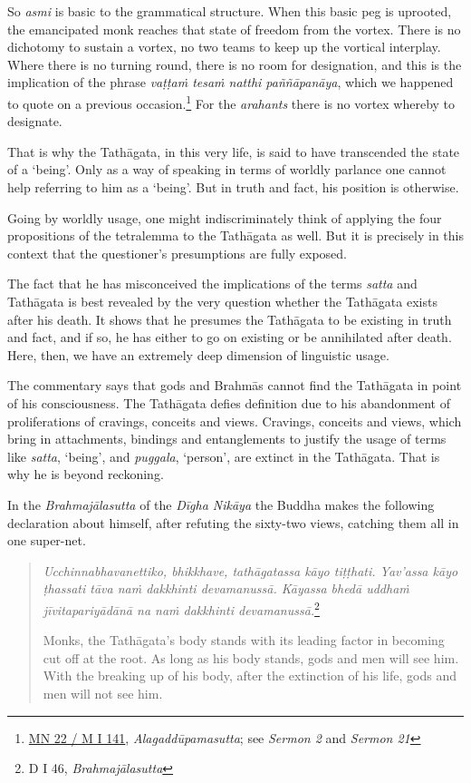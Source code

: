 So \emph{asmi} is basic to the grammatical structure. When this basic peg is uprooted, the emancipated monk reaches that state of freedom from the vortex. There is no dichotomy to sustain a vortex, no two teams to keep up the vortical interplay. Where there is no turning round, there is no room for designation, and this is the implication of the phrase \emph{vaṭṭaṁ tesaṁ natthi paññāpanāya}, which we happened to quote on a previous occasion.\footnote{\href{https://suttacentral.net/mn22/pli/ms}{MN 22 / M I 141}, \emph{Alagaddūpamasutta}; see \emph{Sermon 2} and \emph{Sermon 21}} For the \emph{arahants} there is no vortex whereby to designate.

That is why the Tathāgata, in this very life, is said to have transcended the state of a `being'. Only as a way of speaking in terms of worldly parlance one cannot help referring to him as a `being'. But in truth and fact, his position is otherwise.

Going by worldly usage, one might indiscriminately think of applying the four propositions of the tetralemma to the Tathāgata as well. But it is precisely in this context that the questioner's presumptions are fully exposed.

The fact that he has misconceived the implications of the terms \emph{satta} and Tathāgata is best revealed by the very question whether the Tathāgata exists after his death. It shows that he presumes the Tathāgata to be existing in truth and fact, and if so, he has either to go on existing or be annihilated after death. Here, then, we have an extremely deep dimension of linguistic usage.

The commentary says that gods and Brahmās cannot find the Tathāgata in point of his consciousness. The Tathāgata defies definition due to his abandonment of proliferations of cravings, conceits and views. Cravings, conceits and views, which bring in attachments, bindings and \mbox{entanglements} to justify the usage of terms like \emph{satta}, `being', and \emph{puggala}, `person', are extinct in the Tathāgata. That is why he is beyond reckoning.

In the \emph{Brahmajālasutta} of the \emph{Dīgha Nikāya} the Buddha makes the following declaration about himself, after refuting the sixty-two views, catching them all in one super-net.

\begin{quote}
\emph{Ucchinnabhavanettiko, bhikkhave, tathāgatassa kāyo tiṭṭhati. Yav'assa kāyo ṭhassati tāva naṁ dakkhinti devamanussā. Kāyassa bhedā uddhaṁ jīvitapariyādānā na naṁ dakkhinti devamanussā.}\footnote{D I 46, \emph{Brahmajālasutta}}

Monks, the Tathāgata's body stands with its leading factor in becoming cut off at the root. As long as his body stands, gods and men will see him. With the breaking up of his body, after the extinction of his life, gods and men will not see him.
\end{quote}

